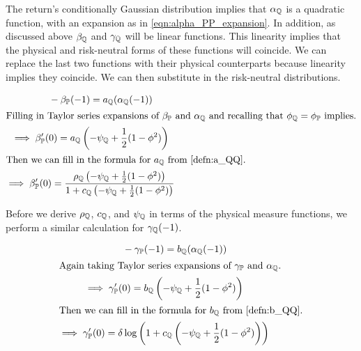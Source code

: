 \documentclass[11pt, letterpaper, twoside, final]{article}
\begin{document}

The return's conditionally Gaussian distribution implies that $\alpha_{\mathbb{Q}}$ is a quadratic function, with an
expansion as in \cref{eqn:alpha_PP_expansion}.
In addition, as discussed above $\beta_{\mathbb{Q}}$ and $\gamma_{\mathbb{Q}}$ will be linear functions. 
This linearity implies that the physical and risk-neutral forms of these functions will coincide. 
We can replace the last two functions with their physical counterparts because linearity implies they
coincide. 
We can then substitute in the risk-neutral distributions.

\begin{gather}
    \label{eqn:beta_qq_at_minus_one}
    \phantom{\implies}   - \beta_{\PP}(-1) = a_{\QQ}(\alpha_{\QQ}(-1))\\
%
    \intertext{Filling in Taylor series expansions of $\beta_{\PP}$ and $\alpha_{\QQ}$ and recalling that
    $\phi_{\QQ} = \phi_{\PP}$ implies.}
%
    \implies \beta_{\PP}'(0) = a_{\QQ}\left(-\psi_{\QQ} + \frac{1}{2} (1- \phi^2)\right)  \\
%
    \intertext{Then we can fill in the formula for $a_{\QQ}$ from \cref{defn:a_QQ}.}
%
    \implies \beta_{\PP}'(0) = \frac{\rho_{\QQ} \left(-\psi_{\QQ} + \frac{1}{2} (1- \phi^2)\right)}{1 + c_{\QQ}
    \left(-\psi_{\QQ} + \frac{1}{2} (1- \phi^2)\right)} 
    \label{eqn:beta_function_QQ}
\end{gather}

Before we derive $\rho_{\mathbb{Q}}$, $c_{\mathbb{Q}}$, and $\psi_{\mathbb{Q}}$ in terms of the physical measure functions, we perform
a similar calculation for $\gamma_{\mathbb{Q}}(-1)$.


\begin{gather}
    \label{eqn:gamma_qq_at_minus_one}
    \phantom{\implies}   - \gamma_{\PP}(-1) = b_{\QQ}(\alpha_{\QQ}(-1))\\
%
    \intertext{Again taking Taylor series expansions of $\gamma_{\PP}$ and $\alpha_{\QQ}$.}
%
    \implies \gamma_{\PP}'(0) = b_{\QQ}\left(-\psi_{\QQ} + \frac{1}{2} (1- \phi^2)\right)  \\
%
    \intertext{Then we can fill in the formula for $b_{\QQ}$ from \cref{defn:b_QQ}.}
%
    \implies \gamma_{\PP}'(0) = \delta \log\left(1 + c_{\QQ} \left(-\psi_{\QQ} + \frac{1}{2} (1-
    \phi^2)\right)\right)
    \label{eqn:gamma_function_QQ}
\end{gather}
\end{document}

